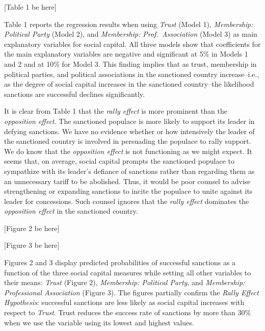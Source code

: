 \documentclass[
  english,
  man]{apa6}
\begin{document}
\begin{center}
[Table 1 be here]
\end{center}

Table 1 reports the regression results when using \emph{Trust} (Model 1), \emph{Membership: Political Party} (Model 2), and \emph{Membership: Prof.~Association} (Model 3) as main explanatory variables for social capital. All three models show that coefficients for the main explanatory variables are negative and significant at 5\% in Models 1 and 2 and at 10\% for Model 3. This finding implies that as trust, membership in political parties, and political associations in the sanctioned country increase--i.e., as the degree of social capital increases in the sanctioned country--the likelihood sanctions are successful declines significantly.

It is clear from Table 1 that the \emph{rally effect} is more prominent than the \emph{opposition effect}. The sanctioned populace is more likely to support its leader in defying sanctions. We have no evidence whether or how intensively the leader of the sanctioned country is involved in persuading the populace to rally support. We do know that the \emph{opposition effect} is not functioning as we might expect. It seems that, on average, social capital prompts the sanctioned populace to sympathize with its leader's defiance of sanctions rather than regarding them as an unnecessary tariff to be abolished. Thus, it would be poor counsel to advise strengthening or expanding sanctions to incite the populace to unite against its leader for concessions. Such counsel ignores that the \emph{rally effect} dominates the \emph{opposition effect} in the sanctioned country.

\begin{center}
[Figure 2 be here]
\end{center}

\begin{center}
[Figure 3 be here]
\end{center}

Figures 2 and 3 display predicted probabilities of successful sanctions as a function of the three social capital measures while setting all other variables to their means: \emph{Trust} (Figure 2), \emph{Membership: Political Party}, and \emph{Membership: Professional Association} (Figure 3). The figures partially confirm the \emph{Rally Effect Hypothesis}: successful sanctions are less likely as social capital increases with respect to \emph{Trust}. Trust reduces the success rate of sanctions by more than 30\% when we use the variable using its lowest and highest values.
\end{document}

